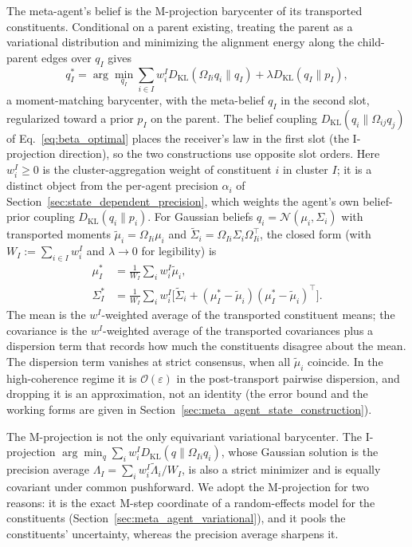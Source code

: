 The meta-agent's belief is the M-projection barycenter of its transported constituents. Conditional on a parent existing, treating the parent as a variational distribution and minimizing the alignment energy along the child-parent edges over $q_I$ gives
\begin{equation}
q_I^* = \arg\min_{q_I} \sum_{i \in I} w_i^I D_{\mathrm{KL}}(\Omega_{Ii} q_i \| q_I) + \lambda D_{\mathrm{KL}}(q_I \| p_I),
\label{eq:meta_agent_barycenter}
\end{equation}
a moment-matching barycenter, with the meta-belief $q_I$ in the second slot, regularized toward a prior $p_I$ on the parent. The belief coupling $D_{\mathrm{KL}}(q_i \| \Omega_{ij} q_j)$ of Eq.~\eqref{eq:beta_optimal} places the receiver's law in the first slot (the I-projection direction), so the two constructions use opposite slot orders. Here $w_i^I \ge 0$ is the cluster-aggregation weight of constituent $i$ in cluster $I$; it is a distinct object from the per-agent precision $\alpha_i$ of Section~\ref{sec:state_dependent_precision}, which weights the agent's own belief-prior coupling $D_{\mathrm{KL}}(q_i \| p_i)$. For Gaussian beliefs $q_i = \mathcal{N}(\mu_i, \Sigma_i)$ with transported moments $\tilde{\mu}_i = \Omega_{Ii}\mu_i$ and $\tilde{\Sigma}_i = \Omega_{Ii}\Sigma_i\Omega_{Ii}^\top$, the closed form (with $W_I := \sum_{i \in I} w_i^I$ and $\lambda \to 0$ for legibility) is
\begin{align}
\mu_I^* &= \tfrac{1}{W_I}\textstyle\sum_i w_i^I \tilde{\mu}_i,
\label{eq:meta_agent_mu_barycenter}
\\
\Sigma_I^* &= \tfrac{1}{W_I}\textstyle\sum_i w_i^I\big[\tilde{\Sigma}_i + (\mu_I^* - \tilde{\mu}_i)(\mu_I^* - \tilde{\mu}_i)^\top\big].
\label{eq:meta_agent_sigma_barycenter}
\end{align}
The mean is the $w^I$-weighted average of the transported constituent means; the covariance is the $w^I$-weighted average of the transported covariances plus a dispersion term that records how much the constituents disagree about the mean. The dispersion term vanishes at strict consensus, when all $\tilde{\mu}_i$ coincide. In the high-coherence regime it is $\mathcal{O}(\varepsilon)$ in the post-transport pairwise dispersion, and dropping it is an approximation, not an identity (the error bound and the working forms are given in Section~\ref{sec:meta_agent_state_construction}).

The M-projection is not the only equivariant variational barycenter. The I-projection $\arg\min_q \sum_i w_i^I D_{\mathrm{KL}}(q \| \Omega_{Ii} q_i)$, whose Gaussian solution is the precision average $\Lambda_I = \sum_i w_i^I \tilde{\Lambda}_i / W_I$, is also a strict minimizer and is equally covariant under common pushforward. We adopt the M-projection for two reasons: it is the exact M-step coordinate of a random-effects model for the constituents (Section~\ref{sec:meta_agent_variational}), and it pools the constituents' uncertainty, whereas the precision average sharpens it.

